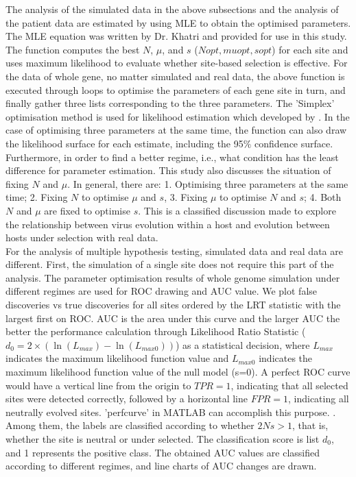 \documentclass[12pt]{article}
\begin{document}
The analysis of the simulated data in the above subsections and the analysis of the patient data are estimated by using MLE to obtain the optimised parameters. The MLE equation was written by Dr. Khatri and provided for use in this study. The function computes the best $N$, $\mu$, and $s$ ($Nopt, muopt, sopt$) for each site and uses maximum likelihood to evaluate whether site-based selection is effective. For the data of whole gene, no matter simulated and real data, the above function is executed through loops to optimise the parameters of each gene site in turn, and finally gather three lists corresponding to the three parameters. The 'Simplex' optimisation method is used for likelihood estimation which developed by \cite{nelder1965simplex}. In the case of optimising three parameters at the same time, the function can also draw the likelihood surface for each estimate, including the 95$\%$ confidence surface. Furthermore, in order to find a better regime, i.e., what condition has the least difference for parameter estimation. This study also discusses the situation of fixing $N$ and $\mu$. In general, there are: 1. Optimising three parameters at the same time; 2. Fixing $N$ to optimise $\mu$ and $s$, 3. Fixing $\mu$ to optimise $N$ and $s$; 4. Both $N$ and $\mu$ are fixed to optimise $s$. This is a classified discussion made to explore the relationship between virus evolution within a host and evolution between hosts under selection with real data. \\

For the analysis of multiple hypothesis testing, simulated data and real data are different. First, the simulation of a single site does not require this part of the analysis. The parameter optimisation results of whole genome simulation under different regimes are used for ROC drawing and AUC value. We plot false discoveries vs true discoveries for all sites ordered by the LRT statistic with the largest first on ROC. AUC is the area under this curve and the larger AUC the better the performance calculation through Likelihood Ratio Statistic ($d_0 = 2\times(\ln(L_{max})-\ln(L_{max0}))$) as a statistical decision, where $L_{max}$ indicates the maximum likelihood function value and $L_{max0}$ indicates the maximum likelihood function value of the null model (s=0). A perfect ROC curve would have a vertical line from the origin to $TPR = 1$, indicating that all selected sites were detected correctly, followed by a horizontal line $FPR=1$, indicating all neutrally evolved sites. 'perfcurve' in MATLAB can accomplish this purpose. \citep{fawcett2004roc}. Among them, the labels are classified according to whether $2Ns>1$, that is, whether the site is neutral or under selected. The classification score is list $d_0$, and 1 represents the positive class. The obtained AUC values are classified according to different regimes, and line charts of AUC changes are drawn.\\
\end{document}
